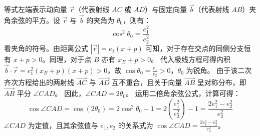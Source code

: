 \begin{solution}
等式左端表示动向量 $\vec{r}$（代表射线 $AC$ 或 $AD$）与固定向量 $\vec{b}$（代表射线 $AB$）夹角余弦的平方。设 $\vec{r}$ 与 $\vec{b}$ 的夹角为 $\theta_0$，则有：
\[ \cos^2 \theta_0 = \frac{e_1^2}{e_2^2} \]
看夹角的符号。由距离公式 $|\vec{r}| = e_1(x+p)$ 可知，对于存在交点的同侧分支恒有 $x+p > 0$。同理，对于点 $B$ 亦有 $x_B+p > 0$。
代入极线方程可得内积 $\vec{b} \cdot \vec{r} = e_1^2(x_B+p)(x+p) > 0$，故 $\cos \theta_0 = \frac{e_1}{e_2} > 0$，$\theta_0$ 为锐角。
由于该二次齐次方程给出的两射线 $\overrightarrow{AC}$ 与 $\overrightarrow{AD}$ 互不重合，且关于向量 $\overrightarrow{AB}$ 呈对称分布，即 $\overrightarrow{AB}$ 平分 $\angle CAD$。
因此，$\angle CAD = 2\theta_0$。
运用二倍角余弦公式，计算可得：
\[ \cos \angle CAD = \cos(2\theta_0) = 2\cos^2 \theta_0 - 1 = 2\left(\frac{e_1^2}{e_2^2}\right) - 1 = \frac{2e_1^2 - e_2^2}{e_2^2} \]
$\angle CAD$ 为定值，且其余弦值与 $e_1, e_2$ 的关系式为 $\cos \angle CAD = \frac{2e_1^2 - e_2^2}{e_2^2}$。
\end{solution}

